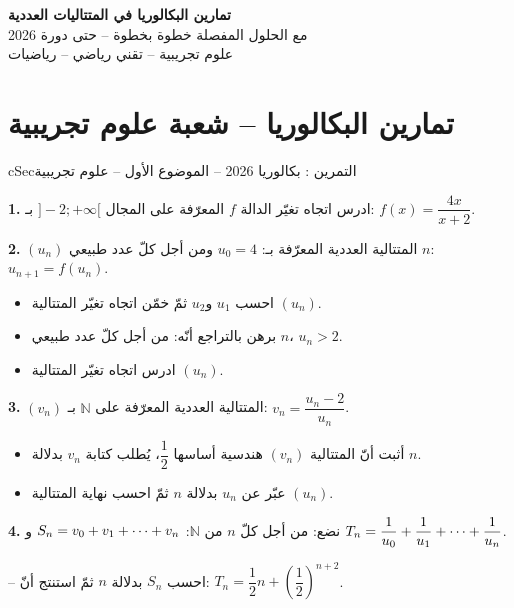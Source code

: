 \documentclass[12pt,a4paper]{article}
\newenvironment{BOX}[2]{\begin{otherlanguage}{english}\begin{arbox}{#1}{#2}}{\end{arbox}\end{otherlanguage}}
\newcounter{exo}
\newenvironment{tamrin}[1]{\stepcounter{exo}\begin{BOX}{cSec}{التمرين \theexo: #1}}{\end{BOX}}
\newenvironment{LTR}{\begin{otherlanguage}{english}}{\end{otherlanguage}}
\renewcommand{\cdots}{\mathinner{\cdotp\cdotp\cdotp}}
\newcommand{\N}{\mathbb{N}}
\newenvironment{sq}{\begin{itemize}[leftmargin=2.4em,itemsep=3pt]}{\end{itemize}}
\newcommand{\qa}{\item[(أ)]}\newcommand{\qb}{\item[(ب)]}\newcommand{\qc}{\item[(جـ)]}\newcommand{\qd}{\item[(د)]}\newcommand{\qe}{\item[(هـ)]}
\newcommand{\QQ}[1]{\par\smallskip\textbf{#1.} }
\begin{document}
\begin{LTR}
\begin{tcolorbox}[enhanced,colback=cSec,colframe=cSec,arc=3mm,halign=center,boxrule=0pt,top=12pt,bottom=12pt,before upper={\selectlanguage{arabic}}]
{\color{white}\fontsize{26}{32}\selectfont\bfseries تمارين البكالوريا في المتتاليات العددية}\\[8pt]
{\color{white}\large مع الحلول المفصلة خطوة بخطوة -- حتى دورة 2026}\\[5pt]
{\color{white}\large علوم تجريبية -- تقني رياضي -- رياضيات}
\end{tcolorbox}
\end{LTR}
\section{تمارين البكالوريا -- شعبة علوم تجريبية}
\begin{tamrin}{بكالوريا 2026 -- الموضوع الأول -- علوم تجريبية}
\QQ{1} ادرس اتجاه تغيّر الدالة $f$ المعرّفة على المجال $]-2;+\infty[$ بـ: $f(x)=\dfrac{4x}{x+2}$.

\QQ{2} $(u_n)$ المتتالية العددية المعرّفة بـ: $u_0=4$ ومن أجل كلّ عدد طبيعي $n$: $u_{n+1}=f(u_n)$.
\begin{sq}
\qa احسب $u_1$ و$u_2$ ثمّ خمّن اتجاه تغيّر المتتالية $(u_n)$.
\qb برهن بالتراجع أنّه: من أجل كلّ عدد طبيعي $n$، $u_n>2$.
\qc ادرس اتجاه تغيّر المتتالية $(u_n)$.
\end{sq}

\QQ{3} $(v_n)$ المتتالية العددية المعرّفة على $\N$ بـ: $v_n=\dfrac{u_n-2}{u_n}$.
\begin{sq}
\qa أثبت أنّ المتتالية $(v_n)$ هندسية أساسها $\dfrac12$، يُطلب كتابة $v_n$ بدلالة $n$.
\qb عبّر عن $u_n$ بدلالة $n$ ثمّ احسب نهاية المتتالية $(u_n)$.
\end{sq}

\QQ{4} نضع: من أجل كلّ $n$ من $\N$: $S_n=v_0+v_1+\cdots+v_n$ و $T_n=\dfrac{1}{u_0}+\dfrac{1}{u_1}+\cdots+\dfrac{1}{u_n}$.

-- احسب $S_n$ بدلالة $n$ ثمّ استنتج أنّ: $T_n=\dfrac12 n+\left(\dfrac12\right)^{n+2}$.
\end{tamrin}
\end{document}
